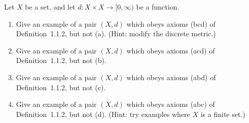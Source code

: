 \begin{problem} 
Let $X$ be a set, and let $d : X \times X \to [0,\infty)$ be a function. 

\begin{enumerate}
\item[(a)] Give an example of a pair $(X,d)$ which obeys axioms (bcd) of Definition~1.1.2, but not (a). 
\hfill (Hint: modify the discrete metric.)
\item[(b)] Give an example of a pair $(X,d)$ which obeys axioms (acd) of Definition~1.1.2, but not (b).
\item[(c)] Give an example of a pair $(X,d)$ which obeys axioms (abd) of Definition~1.1.2, but not (c).
\item[(d)] Give an example of a pair $(X,d)$ which obeys axioms (abc) of Definition~1.1.2, but not (d). 
\hfill (Hint: try examples where $X$ is a finite set.)
\end{enumerate}
\end{problem}
